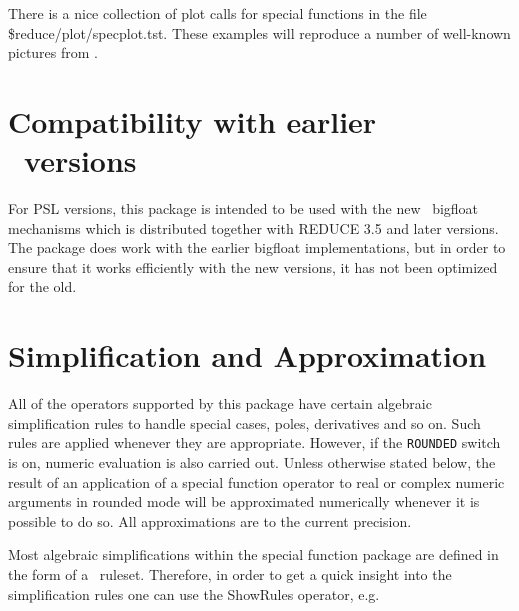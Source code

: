 There is a nice collection of plot calls for special functions
in the file \$reduce/plot/specplot.tst.
These examples will reproduce a number of well-known pictures from
\cite{Abramowitz:72}.

\section{Compatibility with earlier \REDUCE\ versions}

For {PSL} versions,
this package is intended to be used with the new \REDUCE\ bigfloat
mechanisms which is distributed together with REDUCE 3.5 and later versions.
The package does work with the earlier bigfloat implementations,
but in order to
ensure that it works efficiently with the new versions, it has not been
optimized for the old.

\section{Simplification and Approximation}

All of the operators supported by this package have certain algebraic
simplification rules to handle special cases, poles, derivatives and so
on.  Such rules are applied whenever they are appropriate.  However, if
the {\tt ROUNDED} switch is on, numeric evaluation is also carried out.
Unless otherwise stated below, the result of an application of a special
function operator to real or complex numeric arguments in rounded mode
will be approximated numerically whenever it is possible to do so.  All
approximations are to the current precision.

Most algebraic simplifications within the special function package
are defined in the form of a \REDUCE\ ruleset. Therefore, in order to
get a quick insight into the simplification rules one can use the
ShowRules operator, e.g.\\


